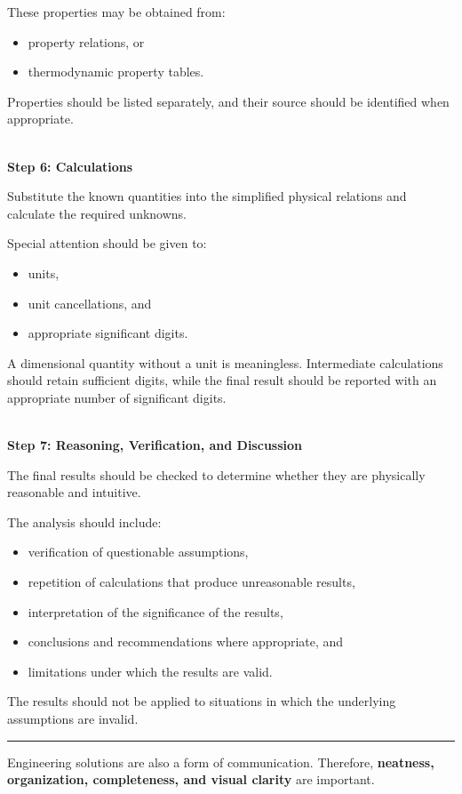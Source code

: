 \documentclass[12pt]{article}
\newcommand{\mysubsection}[2]{%
    \noindent{\headingfont\large #1\space #2\par}
    \vspace{4pt}
    \hrule
    \vspace{15pt}
}
\begin{document}
These properties may be obtained from:
\begin{itemize}
    \item property relations, or
    \item thermodynamic property tables.
\end{itemize}

Properties should be listed separately, and their source should be identified when appropriate.

\textbf{\\ Step 6: Calculations}

Substitute the known quantities into the simplified physical relations and calculate the required unknowns.

Special attention should be given to:
\begin{itemize}
    \item units,
    \item unit cancellations, and
    \item appropriate significant digits.
\end{itemize}

A dimensional quantity without a unit is meaningless. Intermediate calculations should retain sufficient digits, while the final result should be reported with an appropriate number of significant digits.

\textbf{\\ Step 7: Reasoning, Verification, and Discussion}

The final results should be checked to determine whether they are physically reasonable and intuitive.

The analysis should include:
\begin{itemize}
    \item verification of questionable assumptions,
    \item repetition of calculations that produce unreasonable results,
    \item interpretation of the significance of the results,
    \item conclusions and recommendations where appropriate, and
    \item limitations under which the results are valid.
\end{itemize}

The results should not be applied to situations in which the underlying assumptions are invalid.

\mysubsection{}{Importance of Organization}

Engineering solutions are also a form of communication. Therefore, \textbf{neatness, organization, completeness, and visual clarity} are important.
\end{document}
